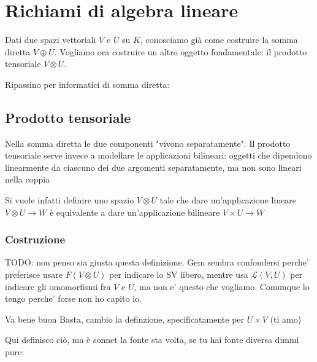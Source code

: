 \section{Richiami di algebra lineare}

Dati due spazi vettoriali $V$ e $U$ su $K$, conosciamo già come costruire la somma diretta $V \oplus U$. Vogliamo ora costruire un altro oggetto fondamentale: il prodotto tensoriale $V \otimes U$.

Ripassino per informatici di somma diretta:


\subsection{Prodotto tensoriale}
Nella somma diretta le due componenti "vivono separatamente". Il prodotto tensoriale serve invece a modellare le applicazioni bilineari: oggetti che dipendono linearmente da ciascuno dei due argomenti separatamente, ma non sono lineari nella coppia

Si vuole infatti definire uno spazio $V \otimes U$ tale che dare un'applicazione lineare $V \otimes U \to W$ è equivalente a dare un'applicazione bilineare $V \times U \to W$

\subsubsection{Costruzione}

TODO: non penso sia giusta questa definizione. Gem sembra confondersi perche' preferisce usare $ F(V \otimes U) $ per indicare lo SV libero, mentre usa $ \mathcal{L}(V,U) $ per indicare gli omomorfismi fra $ V $ e $ U $, ma non e' questo che vogliamo. Comunque lo tengo perche' forse non ho capito io. 

Va bene buon Basta, cambio la definzione, specificatamente per $U\times V$ (ti amo)

Qui definisco ciò, ma è sonnet la fonte sta volta, se tu hai fonte diversa dimmi pure:


